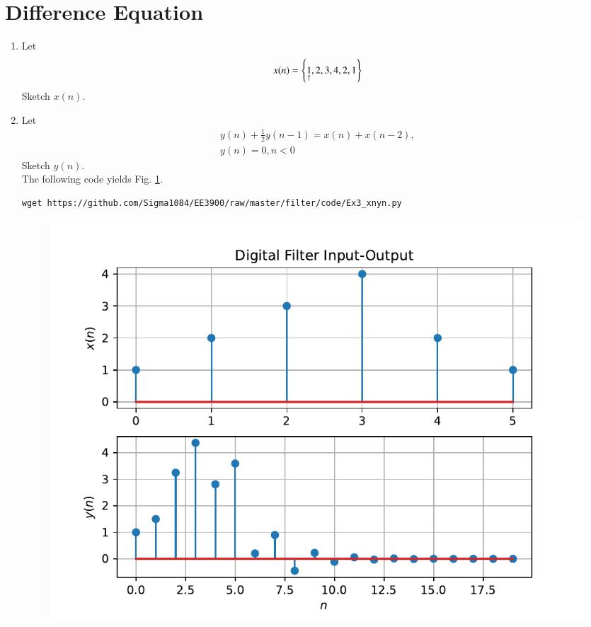 \documentclass[journal,12pt,twocolumn]{IEEEtran}
\renewcommand\thesection{\arabic{section}}
\begin{document}
\section{Difference Equation}
\begin{enumerate}[label=\thesection.\arabic*,ref=\thesection.\theenumi]
\item Let
\begin{equation}
x(n) = \left\{\underset{\uparrow}{1},2,3,4,2,1\right\}
\end{equation}
Sketch $x(n)$.
\item Let
\begin{multline}
\label{eq:iir_filter}
y(n) + \frac{1}{2}y(n-1) = x(n) + x(n-2), 
\\
 y(n) = 0, n < 0
\end{multline}
Sketch $y(n)$.
\\
\solution The following code yields Fig. \ref{fig:xnyn}.
\begin{lstlisting}
wget https://github.com/Sigma1084/EE3900/raw/master/filter/code/Ex3_xnyn.py
\end{lstlisting}
\begin{figure}[!ht]
\begin{center}
\includegraphics[width=\columnwidth]{./figs/xnyn}
\end{center}
\label{fig:xnyn}	
\end{figure}

\end{enumerate}
\end{document}
